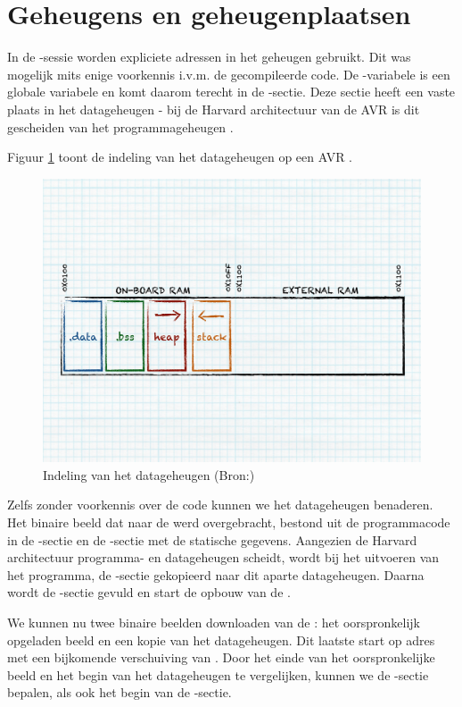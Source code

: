 \section{Geheugens en geheugenplaatsen}

In de -sessie worden expliciete adressen in het geheugen gebruikt. Dit
was mogelijk mits enige voorkennis i.v.m. de gecompileerde code. De
-variabele is een globale variabele en komt daarom terecht in de
-sectie. Deze sectie heeft een vaste plaats in het datageheugen - bij
de Harvard architectuur van de AVR \mcu is dit gescheiden van het
programmageheugen \citep{avr-memory}.

\noindent Figuur \ref{fig:avr-ram-map} toont de indeling van het datageheugen
op een AVR \mcu.

\begin{figure}[ht]
  \centering
  \includegraphics[width=0.9\linewidth]{resources/avr-ram-map.pdf}
  \caption{Indeling van het datageheugen (Bron:\citep{avr-malloc})}
  \label{fig:avr-ram-map}
\end{figure}

Zelfs zonder voorkennis over de code kunnen we het datageheugen benaderen. Het
binaire beeld dat naar de \mcu werd overgebracht, bestond uit de programmacode
in de -sectie en de -sectie met de statische gegevens.
Aangezien de Harvard architectuur programma- en datageheugen scheidt, wordt bij
het uitvoeren van het programma, de -sectie gekopieerd naar dit
aparte datageheugen. Daarna wordt de -sectie gevuld en start de
opbouw van de .

We kunnen nu twee binaire beelden downloaden van de \mcu: het oorspronkelijk
opgeladen beeld en een kopie van het datageheugen. Dit laatste start op adres
 met een bijkomende verschuiving van . Door het einde
van het oorspronkelijke beeld en het begin van het datageheugen te vergelijken,
kunnen we de -sectie bepalen, als ook het begin van de
-sectie.


